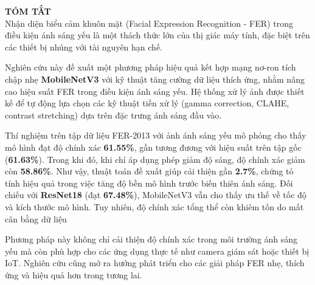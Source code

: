 
{\LARGE \textbf{TÓM TẮT}} \\[1cm]

Nhận diện biểu cảm khuôn mặt (Facial Expression Recognition - FER) trong điều kiện ánh sáng yếu là một thách thức lớn của thị giác máy tính, đặc biệt trên các thiết bị nhúng với tài nguyên hạn chế.

Nghiên cứu này đề xuất một phương pháp hiệu quả kết hợp mạng nơ-ron tích chập nhẹ \textbf{MobileNetV3} với kỹ thuật tăng cường dữ liệu thích ứng, nhằm nâng cao hiệu suất FER trong điều kiện ánh sáng yếu. Hệ thống xử lý ảnh được thiết kế để tự động lựa chọn các kỹ thuật tiền xử lý (gamma correction, CLAHE, contrast stretching) dựa trên đặc trưng ánh sáng đầu vào.

Thí nghiệm trên tập dữ liệu FER-2013 với ảnh ánh sáng yếu mô phỏng cho thấy mô hình đạt độ chính xác \textbf{61.55\%}, gần tương đương với hiệu suất trên tập gốc (\textbf{61.63\%}). Trong khi đó, khi chỉ áp dụng phép giảm độ sáng, độ chính xác giảm còn \textbf{58.86\%}. Như vậy, thuật toán đề xuất giúp cải thiện gần \textbf{2.7\%}, chứng tỏ tính hiệu quả trong việc tăng độ bền mô hình trước biến thiên ánh sáng. Đối chiếu với \textbf{ResNet18} (đạt \textbf{67.48\%}), MobileNetV3 vẫn cho thấy ưu thế về tốc độ và kích thước mô hình. Tuy nhiên, độ chính xác tổng thể còn khiêm tốn do mất cân bằng dữ liệu

Phương pháp này không chỉ cải thiện độ chính xác trong môi trường ánh sáng yếu mà còn phù hợp cho các ứng dụng thực tế như camera giám sát hoặc thiết bị IoT. Nghiên cứu cũng mở ra hướng phát triển cho các giải pháp FER nhẹ, thích ứng và hiệu quả hơn trong tương lai.